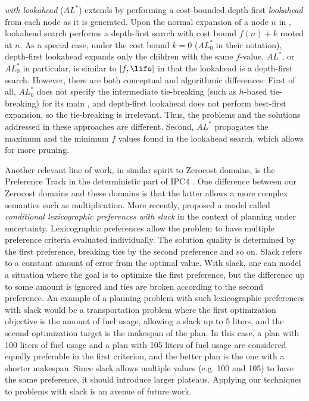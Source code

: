 \emph{\astar with lookahead} ($AL^*$) \cite{stern2010look} extends \astar by performing a cost-bounded depth-first \emph{lookahead} from each node as it is generated. Upon the normal expansion of a node $n$ in \astar, lookahead search performs a depth-first search with cost bound $f(n)+k$ rooted at $n$. As a special case, under the cost bound $k=0$ ($AL^*_0$ in their notation), depth-first lookahead expands only the children with the same $f$-value.
$AL^*$, or $AL^*_0$ in particular, is similar to $[f,\lifo]$ in that the lookahead is a depth-first search.
However, there are both conceptual and algorithmic differences: 
First of all, $AL^*_0$ does not specify the intermediate tie-breaking (such as $h$-based tie-breaking) for its main \astar, and depth-first lookahead does not perform best-first expansion, so the tie-breaking is irrelevant. Thus, the problems and the solutions addressed in these approaches are different.
Second, $AL^*$ propagates the maximum and the minimum $f$ values found in the lookahead search, which allows for more pruning.

Another relevant line of work, in similar spirit to Zerocost domains, is the Preference Track in the deterministic
part of IPC4 \cite{gerevini2009automatically}. One difference between our Zerocost domains and these domains is
that the latter allows a more complex semantics such as multiplication.
% 
More recently,  \citeyear{wray2015multi} proposed a model called \emph{conditional lexicographic preferences with slack} in the context of planning under uncertainty. 
% 
Lexicographic preferences allow the problem to have multiple preference criteria evaluated individually. The
solution quality is determined by the first preference, breaking ties by the second preference and so on.
% 
Slack refers to a constant amount of error from the optimal value. With slack, one can model a situation where the
goal is to optimize the first preference, but the difference up to some amount is ignored and ties are broken according to 
the second preference.
% 
An example of a planning problem with such lexicographic preferences with slack would be a transportation problem where 
the first optimization objective is the amount of fuel usage, allowing a slack up to 5 liters, and 
the second optimization target is the makespan of the plan.
In this case, a plan with 100 liters of fuel usage and a plan with 105 liters of fuel usage are considered equally preferable in the first criterion, and the better plan is the one with a shorter makespan.
% 
Since slack allows multiple values (e.g. 100 and 105) to have the same preference, it should introduce larger plateaus.
Applying our techniques to problems with slack is an avenue of future work.




